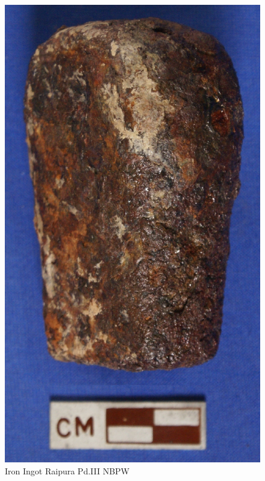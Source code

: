 \begin{figure}[H]
\includegraphics[scale=0.8]{images/chapter-4/fig010.jpg}
\caption{Iron Ingot Raipura Pd.III NBPW}\label{chapter-4-fig10}
\end{figure}

